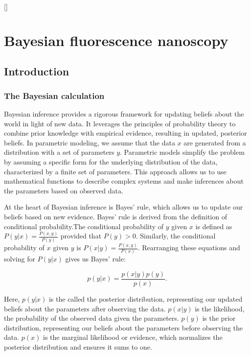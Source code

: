 []

\chapter{Bayesian fluorescence nanoscopy}

\section{Introduction}

\subsection{The Bayesian calculation}
Bayesian inference provides a rigorous framework for updating beliefs about the world in light of new data. It leverages the principles of probability theory to combine prior knowledge with empirical evidence, resulting in updated, posterior beliefs. In parametric modeling, we assume that the data $x$ are generated from a distribution with a set of parameters $y$. Parametric models simplify the problem by assuming a specific form for the underlying distribution of the data, characterized by a finite set of parameters. This approach allows us to use mathematical functions to describe complex systems and make inferences about the parameters based on observed data.

At the heart of Bayesian inference is Bayes' rule, which allows us to update our beliefs based on new evidence. Bayes' rule is derived from the definition of conditional probability.The conditional probability of $y$ given $x$ is defined as $P(y \lvert x) = \frac{P(x,y)}{P(y)}$ provided that $P(y) > 0$. Similarly, the conditional probability of $x$ given $y$ is $P(x \lvert y) = \frac{P(x,y)}{P(x)}$. Rearranging these equations and solving for $P(y\lvert x)$ gives us Bayes' rule:

\begin{equation*}
p(y \lvert x) = \frac{p(x \lvert y) p(y)}{p(x)}.
\end{equation*}

Here, $p(y \lvert x)$ is the called the posterior distribution, representing our updated beliefs about the parameters after observing the data. $p(x \lvert y)$ is the likelihood, the probability of the observed data given the parameters. $p(y)$ is the prior distribution, representing our beliefs about the parameters before observing the data. $p(x)$ is the marginal likelihood or evidence, which normalizes the posterior distribution and ensures it sums to one.


